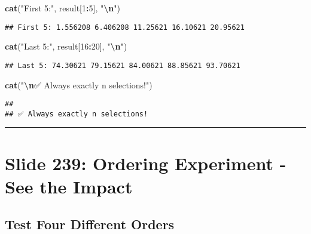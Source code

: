 \documentclass[
]{article}
\newenvironment{Shaded}{\begin{snugshade}}{\end{snugshade}}
\newcommand{\DecValTok}[1]{\textcolor[rgb]{0.00,0.00,0.81}{#1}}
\newcommand{\FunctionTok}[1]{\textcolor[rgb]{0.13,0.29,0.53}{\textbf{#1}}}
\newcommand{\NormalTok}[1]{#1}
\newcommand{\SpecialCharTok}[1]{\textcolor[rgb]{0.81,0.36,0.00}{\textbf{#1}}}
\newcommand{\StringTok}[1]{\textcolor[rgb]{0.31,0.60,0.02}{#1}}
\begin{document}
\begin{Shaded}
\begin{Highlighting}[]
\FunctionTok{cat}\NormalTok{(}\StringTok{"First 5:"}\NormalTok{, result[}\DecValTok{1}\SpecialCharTok{:}\DecValTok{5}\NormalTok{], }\StringTok{"}\SpecialCharTok{\textbackslash{}n}\StringTok{"}\NormalTok{)}
\end{Highlighting}
\end{Shaded}

\begin{verbatim}
## First 5: 1.556208 6.406208 11.25621 16.10621 20.95621
\end{verbatim}

\begin{Shaded}
\begin{Highlighting}[]
\FunctionTok{cat}\NormalTok{(}\StringTok{"Last 5:"}\NormalTok{, result[}\DecValTok{16}\SpecialCharTok{:}\DecValTok{20}\NormalTok{], }\StringTok{"}\SpecialCharTok{\textbackslash{}n}\StringTok{"}\NormalTok{)}
\end{Highlighting}
\end{Shaded}

\begin{verbatim}
## Last 5: 74.30621 79.15621 84.00621 88.85621 93.70621
\end{verbatim}

\begin{Shaded}
\begin{Highlighting}[]
\FunctionTok{cat}\NormalTok{(}\StringTok{"}\SpecialCharTok{\textbackslash{}n}\StringTok{✅ Always exactly n selections!"}\NormalTok{)}
\end{Highlighting}
\end{Shaded}

\begin{verbatim}
## 
## ✅ Always exactly n selections!
\end{verbatim}

\begin{center}\rule{0.5\linewidth}{0.5pt}\end{center}

\section{Slide 239: Ordering Experiment - See the
Impact}\label{slide-239-ordering-experiment---see-the-impact}

\subsection{Test Four Different
Orders}\label{test-four-different-orders}
\end{document}

